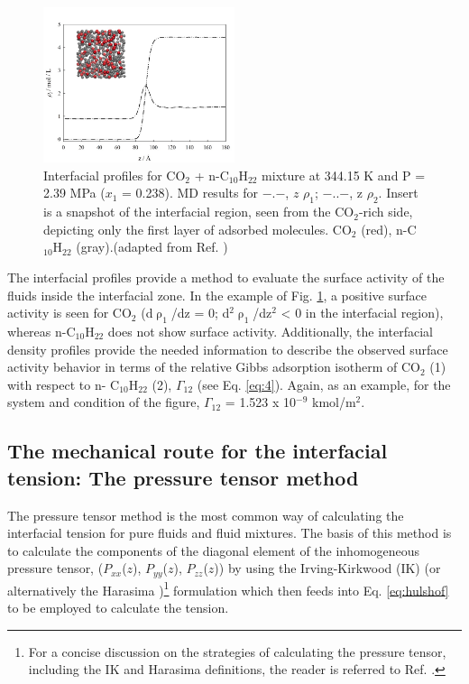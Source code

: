 \documentclass[9pt,tutorial]{livecoms}
\begin{document}
\begin{figure}
\includegraphics[width=0.5\textwidth]{gfx/image54.jpeg}
\caption{Interfacial profiles for CO$_{2}$ + n-C$_{10}$H$_{22}$ mixture at 344.15 K and P = 2.39 MPa ($x_{1}$ = 0.238). MD results for ${-}$.${-}$, $z$ \textendash{} ${\rho}_{1}$; ${-}$..${-}$, z\textendash{} ${\rho}_{2}$. Insert is a snapshot of the interfacial region, seen from the CO$_{2}$-rich side, depicting only the first layer of adsorbed molecules. CO$_{2}$ (red), n-C$_{10}$H$_{22}$ (gray).(adapted from Ref. \citep{mejia2014a})}
\label{fig:9}
\end{figure}

The interfacial profiles provide a method to evaluate the surface activity of
the fluids inside the interfacial zone. In the example of Fig. \ref{fig:9}, a positive
surface activity is seen for CO$_{2}$ (d${\uprho}_{1}$/dz = 0;
d$^{2}{\uprho}_{1}$/dz$^{2}$ {\textless} 0 in the interfacial region),
whereas n-C$_{10}$H$_{22}$ does not show surface activity. Additionally, the
interfacial density profiles provide the needed information to describe the
observed surface activity behavior in terms of the relative Gibbs adsorption
isotherm of CO$_{2}$ (1) with respect to n- C$_{10}$H$_{22}$ (2),
${\Gamma}_{12}$ (see Eq. \ref{eq:4}). Again, as an example, for the system and
condition of the figure, ${\Gamma}_{12}$ = 1.523 x 10$^{-9}$
kmol/m$^{2}$\citep{mejia2014a}.

\subsection{The mechanical route for the interfacial tension: The pressure tensor method}

The pressure tensor method is the most common way of calculating the
interfacial tension for pure fluids and fluid mixtures. The
basis of this method is to calculate the components of the diagonal element of
the inhomogeneous pressure tensor, ($P_{xx}$($z$),
$P_{yy}$($z$), $P_{zz}$($z$)) by using the
Irving-Kirkwood (IK) \citep{irving1950}
(or alternatively the Harasima \citep{harasima1957})\footnote{For
a concise discussion on the strategies of calculating the pressure tensor,
including the IK and Harasima definitions, the reader is referred to Ref. \citep{long2013}.
}
formulation which
then feeds into Eq. \ref{eq:hulshof} to be employed to calculate the tension. 
\end{document}
